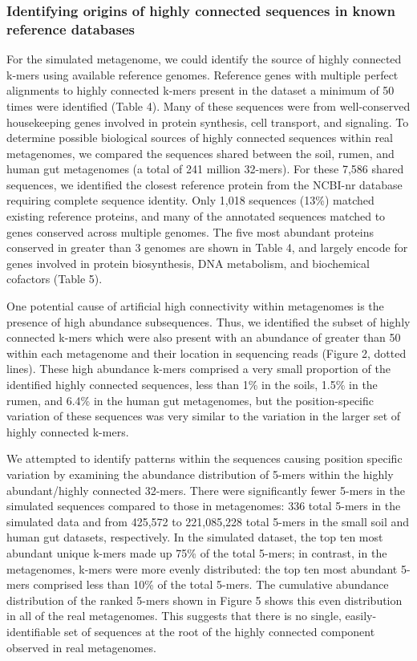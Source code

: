 \documentclass[10pt]{article}
\begin{document}
\subsubsection*{Identifying origins of highly connected sequences in known reference databases}

For the simulated metagenome, we could identify the source of highly
connected k-mers using available reference genomes. Reference genes
with multiple perfect alignments to highly connected k-mers present in
the dataset a minimum of 50 times were identified (Table 4).  Many of
these sequences were from well-conserved housekeeping genes involved
in protein synthesis, cell transport, and signaling.  To determine
possible biological sources of highly connected sequences within real
metagenomes, we compared the sequences shared between the soil, rumen,
and human gut metagenomes (a total of 241 million 32-mers).  For these 7,586 shared sequences, we identified the closest reference
protein from the NCBI-nr database requiring complete sequence
identity.  Only 1,018 sequences (13\%) matched existing reference
proteins, and many of the annotated sequences matched to
genes conserved across multiple genomes.  The five most abundant
proteins conserved in greater than 3 genomes are shown in Table 4, and
largely encode for genes involved in protein biosynthesis, DNA
metabolism, and biochemical cofactors (Table 5).

One potential cause of artificial high connectivity within metagenomes
is the presence of high abundance subsequences.  Thus, we identified the
subset of highly connected k-mers which were also present with an
abundance of greater than 50 within each metagenome and their location
in sequencing reads (Figure 2, dotted lines).  These high abundance
k-mers comprised a very small proportion of the identified highly
connected sequences, less than 1\% in the soils, 1.5\% in the rumen,
and 6.4\% in the human gut metagenomes, but the position-specific
variation of these sequences was very similar to the variation in the
larger set of highly connected k-mers.

We attempted to identify patterns within the sequences causing
position specific variation by examining the abundance distribution of
5-mers within the highly abundant/highly connected 32-mers.  There
were significantly fewer 5-mers in the simulated sequences compared to
those in metagenomes: 336 total 5-mers in the simulated data and from
425,572 to 221,085,228 total 5-mers in the small soil and human gut
datasets, respectively.  In the simulated dataset, the top ten most
abundant unique k-mers made up 75\% of the total 5-mers; in contrast,
in the metagenomes, k-mers were more evenly distributed: the top ten
most abundant 5-mers comprised less than 10\% of the total 5-mers.
The cumulative abundance distribution of the ranked 5-mers shown in
Figure 5 shows this even distribution in all of the real metagenomes.
This suggests that there is no single, easily-identifiable set of
sequences at the root of the highly connected component observed in
real metagenomes.
\end{document}
